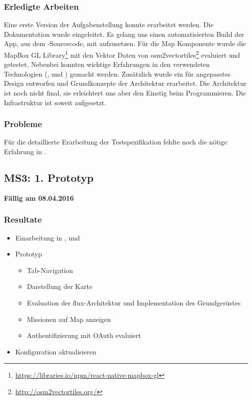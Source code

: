 \subsubsection{Erledigte Arbeiten}
Eine erste Version der Aufgabenstellung konnte erarbeitet werden. 
Die Dokumentation wurde eingeleitet.
Es gelang uns einen automatisierten Build der App, aus dem -Sourcecode, mit  aufzusetzen.
Für die Map Komponente wurde die MapBox GL Library\footnote{\url{https://libraries.io/npm/react-native-mapbox-gl}} mit den Vektor Daten von osm2vectortiles\footnote{\url{http://osm2vectortiles.org/}} evaluiert und getestet.
Nebenbei konnten wichtige Erfahrungen in den verwendeten Technologien (,  und ) gemacht werden.
Zusätzlich wurde ein für  angepasstes Design entworfen und Grundkonzepte der Architektur erarbeitet.
Die Architektur ist noch nicht final, sie erleichtert uns aber den Einstig beim Programmieren.
Die Infrastruktur ist soweit aufgesetzt.

\subsubsection{Probleme}
Für die detaillierte Erarbeitung der Testspezifikation fehlte noch die nötige Erfahrung in .


\subsection{MS3: 1. Prototyp}
\label{pm-ms3}
\textbf{Fällig am 08.04.2016}
\subsubsection{Resultate}
\begin{itemize}
	\item Einarbeitung in ,  und 
	\item {} Prototyp
	\begin{itemize}
		\item Tab-Navigation
		\item Darstellung der Karte
		\item Evaluation der flux-Architektur und Implementation des Grundgerüstes
		\item Missionen auf Map anzeigen
		\item Authentifizierung mit \gls{OAuth} evaluiert
	\end{itemize}
	\item {} Konfiguration aktualisieren
\end{itemize}

